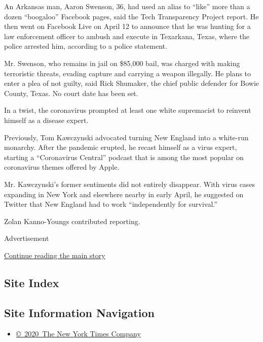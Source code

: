 An Arkansas man, Aaron Swenson, 36, had used an alias to ``like'' more
than a dozen ``boogaloo'' Facebook pages, said the Tech Transparency
Project report. He then went on Facebook Live on April 12 to announce
that he was hunting for a law enforcement officer to ambush and execute
in Texarkana, Texas, where the police arrested him, according to a
police statement.

Mr. Swenson, who remains in jail on \$85,000 bail, was charged with
making terroristic threats, evading capture and carrying a weapon
illegally. He plans to enter a plea of not guilty, said Rick Shumaker,
the chief public defender for Bowie County, Texas. No court date has
been set.

In a twist, the coronavirus prompted at least one white supremacist to
reinvent himself as a disease expert.

Previously, Tom Kawczynski advocated turning New England into a
white-run monarchy. After the pandemic erupted, he recast himself as a
virus expert, starting a ``Coronavirus Central'' podcast that is among
the most popular on coronavirus themes offered by Apple.

Mr. Kawczynski's former sentiments did not entirely disappear. With
virus cases expanding in New York and elsewhere nearby in early April,
he suggested on Twitter that New England had to work ``independently for
survival.''

Zolan Kanno-Youngs contributed reporting.

Advertisement

\protect\hyperlink{after-bottom}{Continue reading the main story}

\hypertarget{site-index}{%
\subsection{Site Index}\label{site-index}}

\hypertarget{site-information-navigation}{%
\subsection{Site Information
Navigation}\label{site-information-navigation}}

\begin{itemize}
\tightlist
\item
  \href{https://help.nytimes3xbfgragh.onion/hc/en-us/articles/115014792127-Copyright-notice}{©~2020~The
  New York Times Company}
\end{itemize}

